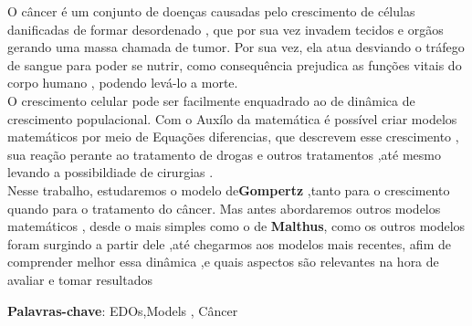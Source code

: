 \documentclass[
	article,			%
	11pt,				%
	oneside,			%
	a4paper,			%
	english,			%
	brazil,				%
	sumario=tradicional
	]{abntex2}
\begin{document}
\frenchspacing


%
%
\maketitle

\newpage
\begin{resumoumacoluna}
 
O câncer é um conjunto de doenças causadas pelo crescimento de células danificadas de formar desordenado , que por sua vez invadem tecidos e orgãos  gerando uma massa chamada de tumor. Por sua vez, ela atua desviando o tráfego de sangue para poder se nutrir, como consequência  prejudica as funções vitais do corpo humano , podendo levá-lo a morte.\\
O crescimento celular pode ser facilmente enquadrado ao de dinâmica  de crescimento populacional. Com o Auxílo da matemática é  possível criar modelos matemáticos por meio de Equações diferencias,
que descrevem esse crescimento , sua reação perante ao tratamento de drogas e outros tratamentos ,até mesmo levando a possibildiade de cirurgias .
\\
Nesse trabalho, estudaremos o modelo de\textbf{Gompertz} ,tanto para o crescimento quando para o tratamento do câncer. Mas antes abordaremos outros modelos matemáticos , desde o mais simples como o de \textbf{Malthus}, como os outros modelos foram surgindo a partir dele ,até chegarmos aos modelos mais recentes, afim de comprender melhor essa dinâmica ,e quais aspectos são relevantes na hora de avaliar e tomar resultados 

 \vspace{\onelineskip}

 \noindent
 \textbf{Palavras-chave}: EDOs,Models , Câncer
 
\end{resumoumacoluna}
\renewcommand{\resumoname}{Abstract}
\end{document}
